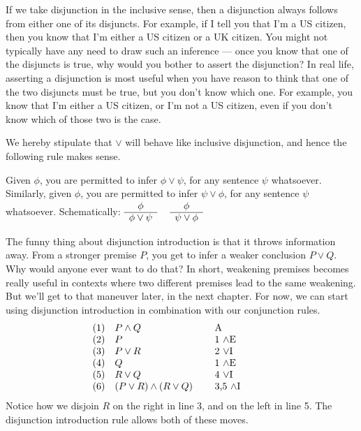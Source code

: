 If we take disjunction in the inclusive sense, then a disjunction
always follows from either one of its disjuncts.  For example, if I
tell you that I'm a US citizen, then you know that I'm either a US
citizen or a UK citizen.  You might not typically have any need to
draw such an inference --- once you know that one of the disjuncts is
true, why would you bother to assert the disjunction?  In real life,
asserting a disjunction is most useful when you have reason to think
that one of the two disjuncts must be true, but you don't know which
one.  For example, you know that I'm either a US citizen, or I'm not a
US citizen, even if you don't know which of those two is the case.

We hereby stipulate that $\vee$ will behave like inclusive
disjunction, and hence the following rule makes sense.

\bigskip
\begin{tcolorbox}[enhanced,width=10cm,title=disjunction introduction
  ($\vee$I),attach boxed title to top
  left={yshift=-2mm,xshift=4mm},boxed title style={sharp corners}]
  Given $\phi$, you are permitted to infer \mbox{$\phi\vee \psi$}, for
  any sentence $\psi$ whatsoever.  Similarly, given $\phi$, you are
  permitted to infer \mbox{$\psi\vee\phi$}, for any sentence $\psi$
  whatsoever.  Schematically:
  $ \begin{array}{c p{0.1cm} c}
       \phi & & \phi \\ \cline{1-1} \cline{3-3} 
    \phi \vee \psi & & \psi\vee\phi \end{array} $ \end{tcolorbox}

\bigskip 

The funny thing about disjunction introduction is that it throws
information away.  From a stronger premise $P$, you get to infer a
weaker conclusion $P\vee Q$.  Why would anyone ever want to do that?
In short, weakening premises becomes really useful in contexts where
two different premises lead to the same weakening.  But we'll get to
that maneuver later, in the next chapter.  For now, we can start using
disjunction introduction in combination with our conjunction rules.
\[ \begin{array}{l >{$}p{3.25cm}<{$} p{2cm}}
     (1) & P\wedge Q & A \\
     (2) & P         & 1 $\wedge$E \\
     (3) & P\vee R   & 2 $\vee$I \\
     (4) & Q         & 1 $\wedge$E \\
     (5) & R\vee Q   & 4 $\vee$I \\
     (6) & (P\vee R)\wedge (R\vee Q) & 3,5 $\wedge$I \end{array}\]
Notice how we disjoin $R$ on the right in line 3, and on the left in
line 5.  The disjunction introduction rule allows both of these moves.

